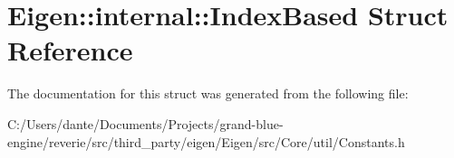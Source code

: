 \hypertarget{struct_eigen_1_1internal_1_1_index_based}{}\section{Eigen\+::internal\+::Index\+Based Struct Reference}
\label{struct_eigen_1_1internal_1_1_index_based}


The documentation for this struct was generated from the following file\+:\begin{DoxyCompactItemize}
\item 
C\+:/\+Users/dante/\+Documents/\+Projects/grand-\/blue-\/engine/reverie/src/third\+\_\+party/eigen/\+Eigen/src/\+Core/util/Constants.\+h\end{DoxyCompactItemize}
